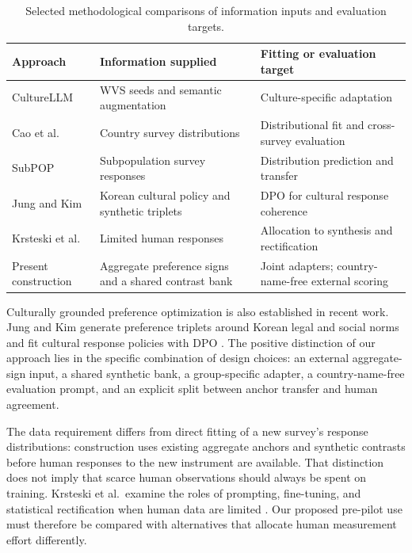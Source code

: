 \begin{table}[htbp]\centering\small
\caption{Selected methodological comparisons of information inputs and evaluation targets.}\label{tab:positioning}
\begin{tabularx}{\linewidth}{@{}>{\raggedright\arraybackslash}p{29mm}>{\raggedright\arraybackslash}X>{\raggedright\arraybackslash}X@{}}\toprule
Approach & Information supplied & Fitting or evaluation target\\\midrule
CultureLLM \cite{li2024culture} & WVS seeds and semantic augmentation & Culture-specific adaptation\\
Cao et al.\ \cite{cao2025} & Country survey distributions & Distributional fit and cross-survey evaluation\\
SubPOP \cite{suh2025} & Subpopulation survey responses & Distribution prediction and transfer\\
Jung and Kim \cite{jung2026} & Korean cultural policy and synthetic triplets & DPO for cultural response coherence\\
Krsteski et al.\ \cite{krsteski2026} & Limited human responses & Allocation to synthesis and rectification\\
Present construction & Aggregate preference signs and a shared contrast bank & Joint adapters; country-name-free external scoring\\\bottomrule
\end{tabularx}\end{table}

Culturally grounded preference optimization is also established in recent work. Jung and Kim generate preference triplets around Korean legal and social norms and fit cultural response policies with DPO \cite{jung2026}. The positive distinction of our approach lies in the specific combination of design choices: an external aggregate-sign input, a shared synthetic bank, a group-specific adapter, a country-name-free evaluation prompt, and an explicit split between anchor transfer and human agreement.

The data requirement differs from direct fitting of a new survey's response distributions: construction uses existing aggregate anchors and synthetic contrasts before human responses to the new instrument are available. That distinction does not imply that scarce human observations should always be spent on training. Krsteski et al.\ examine the roles of prompting, fine-tuning, and statistical rectification when human data are limited \cite{krsteski2026}. Our proposed pre-pilot use must therefore be compared with alternatives that allocate human measurement effort differently.

